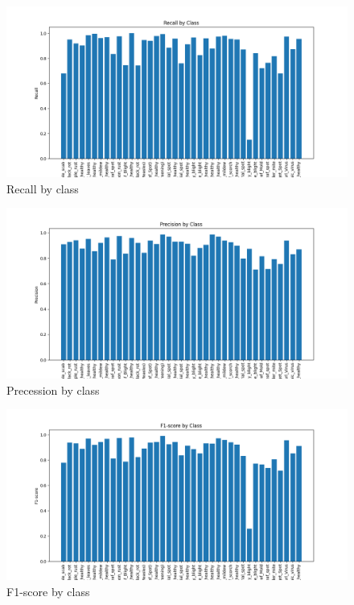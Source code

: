 \documentclass[conference]{IEEEtran}
\begin{document}
\begin{figure}
    \centering
    \includegraphics[width=1\linewidth]{recall_plot.png}
    \caption{Recall by class}
    \label{fig:enter-label}
\end{figure}
\begin{figure}
    \centering
    \includegraphics[width=1\linewidth]{precision_plot.png}
    \caption{Precession by class}
    \label{fig:enter-label}
\end{figure}
\begin{figure}
    \centering
    \includegraphics[width=1\linewidth]{f1-score_plot.png}
    \caption{F1-score by class}
    \label{fig:enter-label}
\end{figure}
\end{document}
